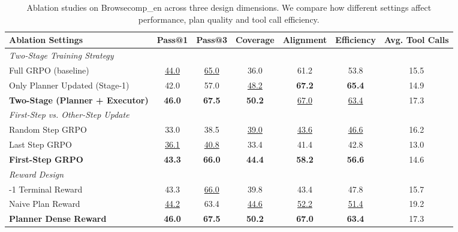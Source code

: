 \begin{table}[t]
\centering
\small
\setlength{\tabcolsep}{4pt} %
\begin{tabular}{lcccccc}
\toprule
\textbf{Ablation Settings} & \textbf{Pass@1} & \textbf{Pass@3} & \textbf{Coverage} & \textbf{Alignment} & \textbf{Efficiency} & \textbf{Avg. Tool Calls} \\
\midrule
\multicolumn{7}{l}{\textit{Two-Stage Training Strategy}} \\
\quad Full GRPO (baseline)         & \underline{44.0} & \underline{65.0} & 36.0 & 61.2 & 53.8 & 15.5 \\
\quad Only Planner Updated (Stage-1) & 42.0 & 57.0 & \underline{48.2} & \textbf{67.2} & \textbf{65.4} & 14.9 \\
\rowcolor{lightblue} \quad  \textbf{Two-Stage (Planner + Executor)} & \textbf{46.0} & \textbf{67.5} & \textbf{50.2}& \underline{67.0} & \underline{63.4}  & 17.3 \\
\midrule
\multicolumn{7}{l}{\textit{First-Step vs. Other-Step Update}} \\
\quad Random Step GRPO             & 33.0 & 38.5 & \underline{39.0} & \underline{43.6} & \underline{46.6} & 16.2 \\
\quad Last Step GRPO               & \underline{36.1} & \underline{40.8} & 33.4 & 41.4 & 42.8 & 13.0 \\
\rowcolor{lightblue} \quad  \textbf{First-Step GRPO} & \textbf{43.3} & \textbf{66.0} & \textbf{44.4} & \textbf{58.2} & \textbf{56.6} & 14.6 \\
\midrule
\multicolumn{7}{l}{\textit{Reward Design}} \\
\quad 0-1 Terminal Reward          & 43.3 & \underline{66.0} & 39.8 & 43.4 & 47.8 & 15.7 \\
\quad Naive Plan Reward            & \underline{44.2} & 63.4 & \underline{44.6} & \underline{52.2} & \underline{51.4} & 19.2 \\
\rowcolor{lightblue} \quad  \textbf{Planner Dense Reward} & \textbf{46.0} & \textbf{67.5} & \textbf{50.2}& \textbf{67.0} & \textbf{63.4} & 17.3 \\
\bottomrule
\end{tabular}
\caption{Ablation studies on Browsecomp\_en across three design dimensions. We compare how different settings affect performance, plan quality and tool call efficiency.}
\end{table}


